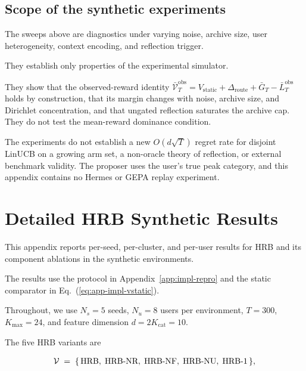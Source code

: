 \documentclass{article} %
\renewcommand{\eqref}[1]{\textup{(\ref{#1})}}
\begin{document}
\subsection{Scope of the synthetic experiments}

\label{app:what-not}

The sweeps above are diagnostics under varying noise, archive size, user
heterogeneity, context encoding, and reflection trigger.

They establish only properties of the experimental simulator.

They show that the observed-reward identity
\(\bar{\mathcal V}_T^{\mathrm{obs}}
=V_{\mathrm{static}}+\Delta_{\mathrm{route}}+\bar G_T
-\bar L_T^{\mathrm{obs}}\) holds by construction, that its margin changes with
noise, archive size, and Dirichlet concentration, and that ungated reflection
saturates the archive cap. They do not test the mean-reward dominance
condition.

The experiments do not establish a new $O(d\sqrt{T})$ regret rate for disjoint
LinUCB on a growing arm set, a non-oracle theory of reflection, or external
benchmark validity. The proposer uses the user's true peak category, and this
appendix contains no Hermes or GEPA replay experiment.

\section{Detailed HRB Synthetic Results}

\label{app:tables}

This appendix reports per-seed, per-cluster, and per-user results for HRB and its component ablations in the synthetic environments.

The results use the protocol in Appendix~\ref{app:impl-repro} and the static comparator in Eq.~\eqref{eq:app-impl-vstatic}.

Throughout, we use \(N_s=5\) seeds, \(N_u=8\) users per environment, \(T=300\),
\(K_{\max}=24\), and feature dimension \(d=2K_{\mathrm{cat}}=10\).

The five HRB variants are

\begin{equation}
\label{eq:app-tab-variants}
\begin{aligned}
\mathcal{V} \;=\; \{\,\textnormal{HRB},\; \textnormal{HRB-NR},\; \textnormal{HRB-NF},\; \textnormal{HRB-NU},\; \textnormal{HRB-1}\,\},
\end{aligned}
\end{equation}
\end{document}
